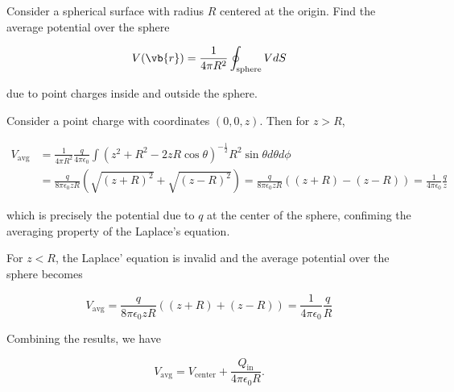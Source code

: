 \documentclass[english,a4paper,12pt]{report}
\begin{document}
{Consider a spherical surface with radius \(R\) centered at the origin. Find the average potential over the sphere

\begin{equation}
    V(\vb{r} ) = \frac{1}{4\pi R^2}\oint_{\text{sphere} } VdS
\end{equation}

due to point charges inside and outside the sphere.}
{Consider a point charge with coordinates \((0,0,z)\). Then for \(z>R\),

\begin{equation}
    \begin{aligned}
        V_{\text{avg} } &= \frac{1}{4\pi R^2} \frac{q}{4\pi\epsilon_0} \int (z^2+R^2-2zR\cos \theta )^{-\frac{1}{2}} R^2\sin \theta d\theta d\phi \\ &= \frac{q}{8\pi \epsilon_0zR} (\sqrt{(z+R)^2} + \sqrt{(z-R)^2} ) = \frac{q}{8\pi \epsilon_0zR} ((z+R)-(z-R)) = \frac{1}{4\pi\epsilon_0} \frac{q}{z} 
    \end{aligned}
\end{equation}

which is precisely the potential due to \(q\) at the center of the sphere, confiming the averaging property of the Laplace's equation.

For \(z<R\), the Laplace' equation is invalid and the average potential over the sphere becomes 

\begin{equation}
    V_{\text{avg} } =  \frac{q}{8\pi \epsilon_0zR} ((z+R) + (z-R)) = \frac{1}{4\pi\epsilon_0} \frac{q}{R}
\end{equation}

Combining the results, we have

\begin{equation}
    V_{\text{avg} } = V_{\text{center} } + \frac{Q_{\text{in} } }{4\pi \epsilon _0 R}.   
\end{equation}~
} 
\end{document}
